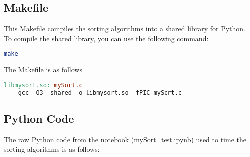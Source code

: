 \documentclass[12pt]{article}
\begin{document}
\subsection{Makefile}

This Makefile compiles the sorting algorithms into a shared library for Python.
To compile the shared library, you can use the following command:

\begin{lstlisting}[language=bash]
make
\end{lstlisting}

The Makefile is as follows:

\begin{lstlisting}[language=make]
libmysort.so: mySort.c
	gcc -O3 -shared -o libmysort.so -fPIC mySort.c
\end{lstlisting}

\subsection{Python Code}

The raw Python code from the notebook (mySort\_test.ipynb) used to time the sorting algorithms is as follows:
\end{document}
